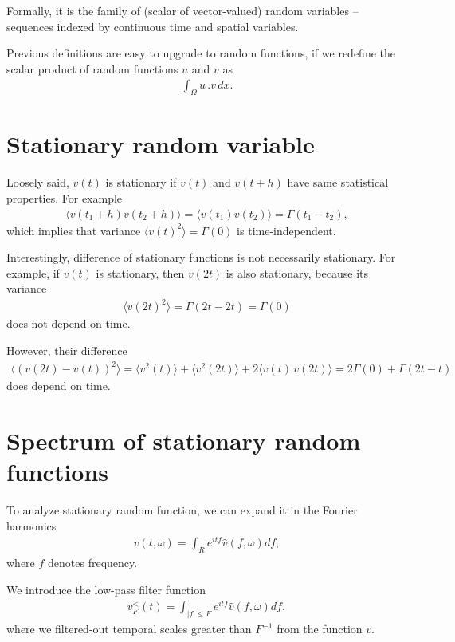 Formally, it is the family of (scalar of vector-valued) random variables -- sequences indexed by continuous time and spatial variables.

\bigskip

Previous definitions are easy to upgrade to random functions, if we redefine the scalar product of random functions $u$ and $v$ as
\begin{align}
\int_{\Omega} u \,. v \, dx.
\end{align}

\section{Stationary random variable}
Loosely said, $v(t)$ is stationary if $v(t)$ and $v(t+h)$ have same statistical properties.
For example
\begin{align*}
\langle v(t_1+h) v(t_2 + h) \rangle = \langle v(t_1) v(t_2) \rangle = \Gamma(t_1 - t_2),
\end{align*}
which implies that variance $\langle v(t)^2 \rangle = \Gamma(0)$ is time-independent.

Interestingly, difference of stationary functions is not necessarily stationary. 
For example, if $v(t)$ is stationary, then $v(2t)$ is also stationary, because its variance
\begin{align*}
\langle v(2t)^2 \rangle = \Gamma(2t - 2t) = \Gamma(0)
\end{align*}
does not depend on time.

However, their difference
\begin{align}
\langle (v(2t) - v(t))^2 \rangle = \langle v^2(t) \rangle + \langle v^2(2t) \rangle + 2\langle v(t)\,v(2t) \rangle = 2\Gamma(0) + \Gamma(2t - t)
\end{align} 
does depend on time.

\section{Spectrum of stationary random functions}

To analyze stationary random function, we can expand it in the Fourier harmonics
\begin{align}
v(t,\omega) = \int_{R} e^{itf} \hat{v}(f,\omega) df,
\end{align}
where $f$ denotes frequency.

We introduce the low-pass filter function
\begin{align}
v_F^{<}(t) = \int_{|f| \leq F} e^{itf} \hat{v}(f,\omega) df,
\end{align} 
where we filtered-out temporal scales greater than $F^{-1}$ from the function $v$.

